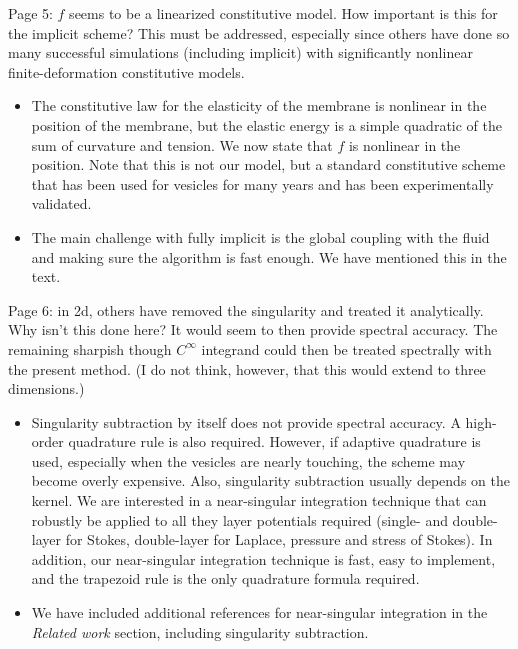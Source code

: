 \documentclass[11pt]{article}
\newcommand{\comment}[1]{{\color{blue} #1}}
\begin{document}
\comment{Page 5: $f$ seems to be a linearized constitutive model. How
important is this for the implicit scheme? This must be addressed,
especially since others have done so many successful simulations
(including implicit) with significantly nonlinear finite-deformation
constitutive models.}
\begin{itemize}
  \item The constitutive law for the elasticity of the membrane is
  nonlinear in the position of the membrane, but the elastic energy is
  a simple quadratic of the sum of curvature and  tension.  We now state
  that $f$ is nonlinear in the position. Note that this is not our
  model, but a standard constitutive scheme that has been used for
  vesicles for many years and has been experimentally validated.

  \item The main challenge with fully implicit is the global coupling
  with the fluid and making sure the algorithm is fast enough.  We have
  mentioned this in the text.
\end{itemize}

\comment{Page 6: in 2d, others have removed the singularity and treated
it analytically. Why isn’t this done here? It would seem to then provide
spectral accuracy. The remaining sharpish though $C^{\infty}$ integrand
could then be treated spectrally with the present method. (I do not
think, however, that this would extend to three dimensions.)}
\begin{itemize}
  \item Singularity subtraction by itself does not provide spectral
  accuracy.  A high-order quadrature rule is also required.  However,
  if adaptive quadrature is used, especially when the vesicles are
  nearly touching, the scheme may become overly expensive.  Also,
  singularity subtraction usually depends on the kernel.  We are
  interested in a near-singular integration technique that can robustly
  be applied to all they layer potentials required (single- and
  double-layer for Stokes, double-layer for Laplace, pressure and
  stress of Stokes).  In addition, our near-singular integration
  technique is fast, easy to implement, and the trapezoid rule is the
  only quadrature formula required. 

  \item We have included additional references for near-singular
  integration in the {\em Related work} section, including singularity
  subtraction.
\end{itemize}
\end{document}
